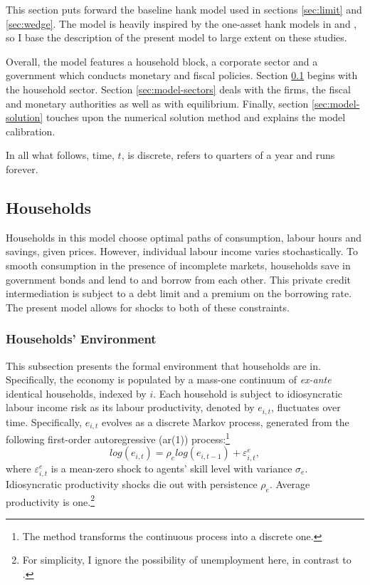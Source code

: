 \documentclass[12pt]{article} %
\numberwithin{equation}{section} %
\numberwithin{figure}{section}
\numberwithin{table}{section}
\begin{document}
This section puts forward the baseline \Gls{hank} model used in sections \ref{sec:limit} and \ref{sec:wedge}. The model is heavily inspired by the one-asset \Gls{hank} models in \textcite{auclert2021} and \textcite{boehl2023econpizza}, so I base the description of the present model to large extent on these studies.

Overall, the model features a household block, a corporate sector and a government which conducts monetary and fiscal policies. Section \ref{sec:model-hh} begins with the household sector. Section \ref{sec:model-sectors} deals with the firms, the fiscal and monetary authorities as well as with equilibrium. Finally, section \ref{sec:model-solution} touches upon the numerical solution method and explains the model calibration. 

In all what follows, time, $t$, is discrete, refers to quarters of a year and runs forever.

\subsection{Households}
\label{sec:model-hh}

Households in this model choose optimal paths of consumption, labour hours and savings, given prices. However, individual labour income varies stochastically. To smooth consumption in the presence of incomplete markets, households save in government bonds and lend to and borrow from each other. This private credit intermediation is subject to a debt limit and a premium on the borrowing rate. The present model allows for shocks to both of these constraints.

\subsubsection{Households' Environment}
\label{sec:model-hh-environment}

This subsection presents the formal environment that households are in. Specifically, the economy is populated by a mass-one continuum of \textit{ex-ante} identical households, indexed by $i$. Each household is subject to idiosyncratic labour income risk as its labour productivity, denoted by $e_{i,t}$, fluctuates over time. Specifically, $e_{i,t}$ evolves as a discrete Markov process, generated from the following first-order autoregressive (\Gls{ar}(1)) process:\footnote{The \textcite{rouwenhorst1995} method transforms the continuous process into a discrete one.}
\begin{equation}
    log(e_{i,t}) = \rho_e log(e_{i,t-1}) + \varepsilon^e_{i,t}, \label{eq:hh-income-process}
\end{equation}
where $\varepsilon^e_{i,t}$ is a mean-zero shock to agents' skill level with variance $\sigma_e$. Idiosyncratic productivity shocks die out with persistence $\rho_e$. Average productivity is one.\footnote{For simplicity, I ignore the possibility of unemployment here, in contrast to \textcite{gl2017}.}
\end{document}
